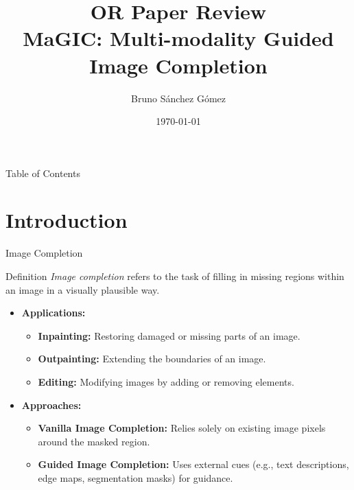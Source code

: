 \documentclass[pdf]{beamer}
\title{OR Paper Review \\MaGIC:  Multi-modality Guided Image Completion}
\author{Bruno Sánchez Gómez}
\date{\today}
\begin{document}
\begin{frame}
    \titlepage
\end{frame}


\begin{frame}{Table of Contents}
    \tableofcontents
\end{frame}

\section{Introduction}

\begin{frame}{Image Completion}
    \centering
    \begin{minipage}{0.8\textwidth}
        \begin{block}{Definition}
            \centering
            \textit{Image completion} refers to the task of filling in missing regions within an image in a visually plausible way.
        \end{block}
    \end{minipage}
    \vspace{0.5cm}
    \begin{itemize}
        \item \textbf{Applications:}
            \begin{itemize}
                \item \textbf{Inpainting:} Restoring damaged or missing parts of an image.
                \item \textbf{Outpainting:} Extending the boundaries of an image.
                \item \textbf{Editing:} Modifying images by adding or removing elements.
            \end{itemize}
        \item \textbf{Approaches:}
            \begin{itemize}
                \item \textbf{Vanilla Image Completion:} Relies solely on existing image pixels around the masked region.
                \item \textbf{Guided Image Completion:} Uses external cues (e.g., text descriptions, edge maps, segmentation masks) for guidance.
            \end{itemize}
    \end{itemize}
\end{frame}
\end{document}
